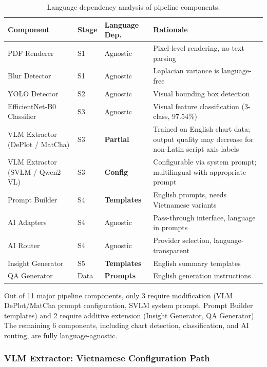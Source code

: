 \begin{table}[htbp]
\centering
\caption{Language dependency analysis of pipeline components.}
\label{tab:lang_analysis}
\begin{tabular}{@{}lllp{5.5cm}@{}}
\toprule
\textbf{Component} & \textbf{Stage} & \textbf{Language Dep.} & \textbf{Rationale} \\
\midrule
PDF Renderer           & S1 & Agnostic  & Pixel-level rendering, no text parsing \\
Blur Detector          & S1 & Agnostic  & Laplacian variance is language-free \\
YOLO Detector          & S2 & Agnostic  & Visual bounding box detection \\
EfficientNet-B0 Classifier & S3 & Agnostic  & Visual feature classification (3-class, 97.54\%) \\
VLM Extractor (DePlot / MatCha) & S3 & \textbf{Partial}   & Trained on English chart data; output quality may decrease for non-Latin script axis labels \\
VLM Extractor (SVLM / Qwen2-VL) & S3 & \textbf{Config}   & Configurable via system prompt; multilingual with appropriate prompt \\
\midrule
Prompt Builder         & S4 & \textbf{Templates} & English prompts, needs Vietnamese variants \\
AI Adapters            & S4 & Agnostic  & Pass-through interface, language in prompts \\
AI Router              & S4 & Agnostic  & Provider selection, language-transparent \\
Insight Generator      & S5 & \textbf{Templates} & English summary templates \\
QA Generator           & Data & \textbf{Prompts}   & English generation instructions \\
\bottomrule
\end{tabular}
\end{table}

Out of 11 major pipeline components, only 3 require modification (VLM DePlot/MatCha
prompt configuration, SVLM system prompt, Prompt Builder templates) and 2 require
additive extension (Insight Generator, QA Generator). The remaining 6 components,
including chart detection, classification, and AI routing, are fully language-agnostic.

\subsubsection{VLM Extractor: Vietnamese Configuration Path}

